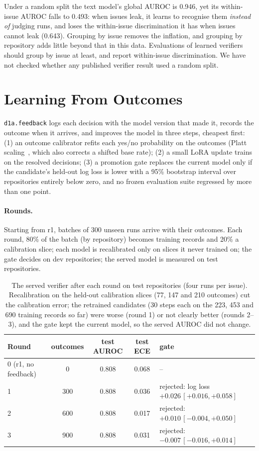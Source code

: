 \documentclass[11pt]{article}
\begin{document}
Under a random split the text model's global AUROC is 0.946, yet its within-issue AUROC falls to 0.493: when issues leak, it learns to recognise them \emph{instead of} judging runs, and loses the within-issue discrimination it has when issues cannot leak (0.643).
Grouping by issue removes the inflation, and grouping by repository adds little beyond that in this data. Evaluations of learned verifiers should group by issue
at least, and report within-issue discrimination. We have not checked whether any published verifier result used a random split.

\section{Learning From Outcomes}\label{sec:loop}
\texttt{d1a.feedback} logs each decision with the model version that made it, records the outcome when it arrives, and improves the model in three steps,
cheapest first: (1) an outcome calibrator refits each yes/no probability on the outcomes (Platt scaling~\cite{platt}, which also corrects a shifted base rate);
(2) a small LoRA update trains on the resolved decisions; (3) a promotion gate replaces the current model only if the candidate's held-out log loss is lower
with a 95\% bootstrap interval over repositories entirely below zero, and no frozen evaluation suite regressed by more than one point.

\paragraph{Rounds.} Starting from r1, batches of 300 unseen runs arrive with their outcomes. Each round, 80\% of the batch (by repository) becomes training
records and 20\% a calibration slice; each model is recalibrated only on slices it never trained on; the gate decides on dev repositories; the served model is
measured on test repositories.

\begin{table}[h]\centering\small
\begin{tabular}{lcccl}\toprule
Round & outcomes & test AUROC & test ECE & gate \\\midrule
0 (r1, no feedback) & 0 & 0.808 & 0.068 & -- \\
1 & 300 & 0.808 & 0.036 & rejected: log loss $+0.026\,[+0.016, +0.058]$ \\
2 & 600 & 0.808 & 0.017 & rejected: $+0.010\,[-0.004, +0.050]$ \\
3 & 900 & 0.808 & 0.031 & rejected: $-0.007\,[-0.016, +0.014]$ \\\bottomrule
\end{tabular}
\caption{The served verifier after each round on test repositories (four runs per issue). Recalibration on the held-out calibration slices (77, 147 and 210
outcomes) cut the calibration error; the retrained candidates (30 steps each on the 223, 453 and 690 training records so far) were worse (round 1) or not clearly better (rounds 2--3),
and the gate kept the current model, so the served AUROC did not change.}\label{tab:rounds}
\end{table}
\end{document}
